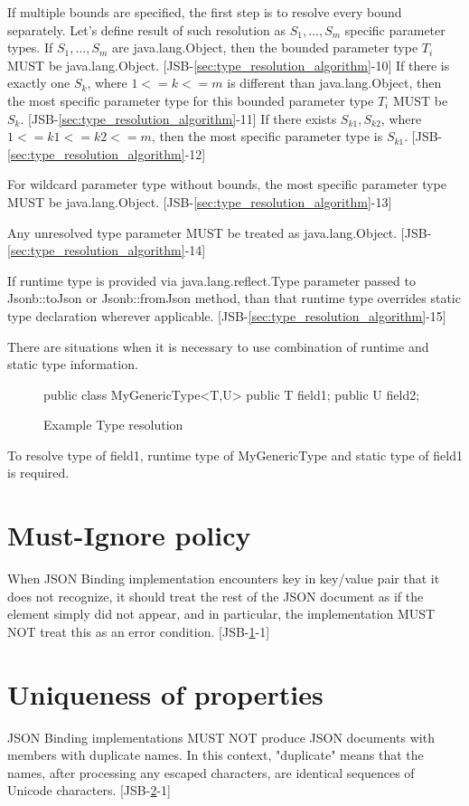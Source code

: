 If multiple bounds are specified, the first step is to resolve every bound separately. Let's define result of such resolution as \(S_1,\dotsc,S_m\) specific parameter types. If \(S_1,\dotsc,S_m\) are java.lang.Object, then the bounded parameter type \(T_i\) MUST be java.lang.Object. [JSB-\ref{sec:type_resolution_algorithm}-10] 
If there is exactly one \(S_k\), where \(1<=k<=m\) is different than java.lang.Object, then the most specific parameter type for this bounded parameter type \(T_i\) MUST be \(S_k\). [JSB-\ref{sec:type_resolution_algorithm}-11] If there exists \(S_{k1},S_{k2}\), where \(1<=k1<=k2<=m\), then the most specific parameter type is \(S_{k1}\). [JSB-\ref{sec:type_resolution_algorithm}-12]

For wildcard parameter type without bounds, the most specific parameter type MUST be java.lang.Object. [JSB-\ref{sec:type_resolution_algorithm}-13]

Any unresolved type parameter MUST be treated as java.lang.Object. [JSB-\ref{sec:type_resolution_algorithm}-14]

If runtime type is provided via java.lang.reflect.Type parameter passed to Jsonb::toJson or Jsonb::fromJson method, than that runtime type overrides static type declaration wherever applicable. [JSB-\ref{sec:type_resolution_algorithm}-15]

There are situations when it is necessary to use combination of runtime and static type information. 
\begin{figure}[hbtp]
\caption{Example Type resolution}
\label{ex2}
\begin{listing}{1}
public class MyGenericType<T,U> {
    public T field1;
    public U field2;
}\end{listing}
\end{figure}

To resolve type of field1, runtime type of MyGenericType and static type of field1 is required.

\section{Must-Ignore policy}
\label{sec:must_ignore_policy}
When JSON Binding implementation encounters key in key/value pair that it does not recognize, it should treat the rest of the JSON document as if the element simply did not appear, and in particular, the implementation MUST NOT treat this as an error condition. [JSB-\ref{sec:must_ignore_policy}-1]

\section{Uniqueness of properties}
\label{sec:uniqueness_properties}
JSON Binding implementations MUST NOT produce JSON documents with members with duplicate names. In this context, "duplicate" means that the names, after processing any escaped characters, are identical sequences of Unicode characters. [JSB-\ref{sec:uniqueness_properties}-1]

